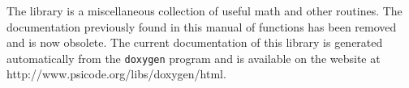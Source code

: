 The  library is a miscellaneous collection of useful
math and other routines.  The documentation previously found in this
manual of  functions has been removed and is now obsolete.
The current documentation of this library is generated automatically from
the {\tt doxygen} program and is available on the website at
{http://www.psicode.org/libs/doxygen/html}.

